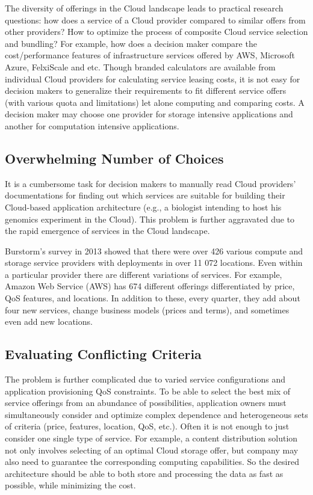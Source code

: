 The diversity of offerings in the Cloud landscape
leads to practical research questions: how does a service
of a Cloud provider compared to similar offers from other providers? 
How to optimize the process of composite Cloud service selection and
bundling? For example, how does a decision maker compare
the cost/performance features of infrastructure services
offered by AWS, Microsoft Azure, FelxiScale and etc. 
Though branded calculators are available from individual Cloud providers for
calculating service leasing costs, it is not easy for decision
makers to generalize their requirements to fit different
service offers (with various quota and limitations) let alone
computing and comparing costs. A decision
maker may choose one provider for storage intensive
applications and another for computation intensive
applications. 

\subsection{Overwhelming Number of Choices}
\label{subsec:OverwhelmingNumberOfChoices}
It is a cumbersome task for decision makers to manually
read Cloud providers’ documentations for finding out which
services are suitable for building their Cloud-based
application architecture (e.g., a biologist intending to host his
genomics experiment in the Cloud). This problem is further
aggravated due to the rapid emergence of services in the
Cloud landscape.

Burstorm's \cite{Burstorm} survey in 2013 showed that
there were over 426 various compute and
storage service providers with deployments in over 11 072
locations. Even within a particular provider there are different
variations of services. 
For example, Amazon Web Service
(AWS) has 674 different offerings differentiated by price, QoS
features, and locations. In addition to these, every quarter, they add
about four new services, change business models (prices and
terms), and sometimes even add new locations.

\subsection{Evaluating Conflicting Criteria}
\label{subsec:ConflictingRequirements}
The problem is further complicated due to varied service configurations
and application provisioning QoS constraints. 
To be able to select the best mix of service offerings from an abundance of
possibilities, application owners must simultaneously consider
and optimize complex dependence and heterogeneous sets of
criteria (price, features, location, QoS, etc.). 
Often it is not enough to just consider one single type of service.
For example, a content distribution solution not only involves
selecting of an optimal Cloud storage offer, but
company may also need to guarantee the corresponding computing capabilities.
So the desired architecture should be able to both store and processing the data as fast as possible, while minimizing the cost.

